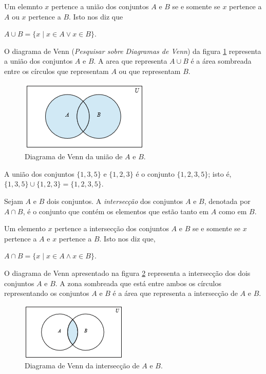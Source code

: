 Um elemnto $x$ pertence a união dos conjuntos $A$ e $B$ se e somente se $x$
pertence a $A$ ou $x$ pertence a $B$. Isto nos diz que
\begin{center}
$A \cup B = \{x \mid x\in A \lor x\in B\}.$
\end{center}

O diagrama de Venn (\emph{Pesquisar sobre Diagramas de Venn}) da figura
\ref{fig31} representa a união dos conjuntos $A$ e $B$. A area que representa
$A \cup B$ é a área sombreada entre os círculos que representam $A$ ou que
representam $B$.

\begin{figure}[H]
	\centering
	\includegraphics[scale=2]{chapter/imagens/31}
	\caption{Diagrama de Venn da união de $A$ e $B$.}
	\label{fig31}
\end{figure}

\begin{exmp}
\label{exem319}
A união dos conjuntos $\{1,3,5\}$ e $\{1,2,3\}$ é o conjunto $\{1,2,3,5\}$; isto
é, $\{1,3,5\} \cup \{1,2,3\} = \{1,2,3,5\}$.
\end{exmp}

\begin{defn}
\label{def311}
Sejam $A$ e $B$ dois conjuntos. A \emph{intersecção} dos conjuntos $A$ e $B$,
denotada por $A \cap B$, é o conjunto que contém os elementos que estão tanto em
$A$ como em $B$.
\end{defn}

Um elemento $x$ pertence a intersecção dos conjuntos $A$ e $B$ se e somente se
$x$ pertence a $A$ e $x$ pertence a $B$. Isto nos diz que,
\begin{center}
$A \cap B = \{x \mid x \in A \land x \in B\}$.
\end{center}

O diagrama de Venn apresentado na figura \ref{fig32} representa a intersecção
dos dois conjuntos $A$ e $B$. A zona sombreada que está entre ambos os círculos
representando os conjuntos $A$ e $B$ é a área que representa a intersecção de
$A$ e $B$.

\begin{figure}[H]
	\centering
	\includegraphics[scale=2.5]{chapter/imagens/32}
	\caption{Diagrama de Venn da intersecção de $A$ e $B$.}
	\label{fig32}
\end{figure}

